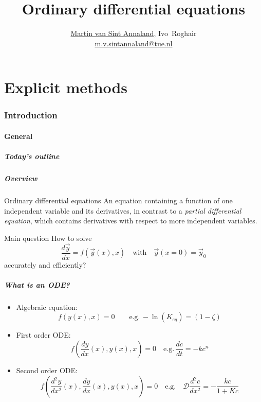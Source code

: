 \documentclass[11pt,table,final,fleqn,xcolor={usenames,dvipsnames,table}]{beamer}
\title{Ordinary differential equations}
\author[M.~Van Sint Annaland]{\underline{Martin van Sint Annaland}, Ivo~Roghair \\ \vspace*{1em} {\scriptsize \underline{m.v.sintannaland@tue.nl}}}
\institute[SPI]{{Chemical Process Intensification,\\
  Eindhoven University of Technology}}
\date
\begin{document}


\frame[plain]{
  \titlepage
}

\part{Explicit methods}
\frame{\partpage}

\section{Introduction}
\subsection*{General}
\begin{frame}[label=contents]
  \frametitle{Today's outline}
\end{frame}
 
\begin{frame}
  \frametitle{Overview}
    \begin{block}{Ordinary differential equations}
      An equation containing a function of one independent variable and its derivatives, in contrast to a \emph{partial differential equation}, which contains derivatives with respect to more independent variables.
    \end{block}
    \pause
  \begin{block}{Main question}
  How to solve 
  \[
    \frac{d\vec{y}}{dx} = f(\vec{y}(x),x) \quad \text{with} \quad \vec{y}(x=0) = \vec{y}_0
  \]
  accurately and efficiently?
  \end{block}
\end{frame}

\begin{frame}
  \frametitle{What is an ODE?}
  \begin{itemize}
    \item Algebraic equation:
    \[
      f(y(x),x) = 0 \qquad \text{e.g.} \, -\ln(K_{eq})=(1-\zeta)
    \]
    \item First order ODE:
    \[
      f\left(\frac{dy}{dx}(x),y(x),x\right) = 0 \quad \text{e.g.} \, \frac{dc}{dt} = -kc^n
    \]
    \item Second order ODE:
    \[
      f\left(\frac{d^2y}{dx^2}(x),\frac{dy}{dx}(x),y(x),x \right) = 0 \quad \text{e.g.} \quad \mathcal{D}\frac{d^2c}{dx^2}= - \frac{kc}{1+Kc}
    \]
  \end{itemize}
\end{frame}
\end{document}
